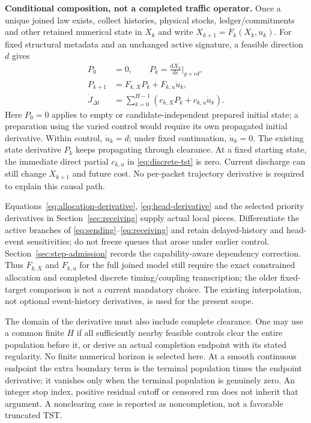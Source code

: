 \documentclass[11pt]{article}
\newcommand{\dd}{\mathrm d}
\begin{document}
\textbf{Conditional composition, not a completed traffic operator.} Once a unique joined law exists, collect histories, physical stocks, ledger/commitments and other retained numerical state in $X_k$ and write $X_{k+1}=F_k(X_k,u_k)$. For fixed structural metadata and an unchanged active signature, a feasible direction $d$ gives
\begin{align}
 P_0&=0,\qquad P_k=\frac{\dd X_k}{\dd\epsilon}\bigg|_{g+\epsilon d},\\
 P_{k+1}&=F_{k,X}P_k+F_{k,u}\dot u_k,
 \label{eq:state-sensitivity}\\
 \dot J_{\Delta t}&=\sum_{k=0}^{H-1}
 \left(c_{k,X}P_k+c_{k,u}\dot u_k\right).
 \label{eq:objective-sensitivity}
\end{align}
Here $P_0=0$ applies to empty or candidate-independent prepared initial state; a preparation using the varied control would require its own propagated initial derivative. Within control, $\dot u_k=d$; under fixed continuation, $\dot u_k=0$. The existing state derivative $P_k$ keeps propagating through clearance. At a fixed starting state, the immediate direct partial $c_{k,u}$ in \eqref{eq:discrete-tst} is zero. Current discharge can still change $X_{k+1}$ and future cost. No per-packet trajectory derivative is required to explain this causal path.

Equations~\eqref{eq:allocation-derivative}, \eqref{eq:head-derivative} and the selected priority derivatives in Section~\ref{sec:receiving} supply actual local pieces. Differentiate the active branches of \eqref{eq:sending}--\eqref{eq:receiving} and retain delayed-history and head-event sensitivities; do not freeze queues that arose under earlier control. Section~\ref{sec:step-admission} records the capability-aware dependency correction. Thus $F_{k,X}$ and $F_{k,u}$ for the full joined model still require the exact constrained allocation and completed discrete timing/coupling transcription; the older fixed-target comparison is not a current mandatory choice. The existing interpolation, not optional event-history derivatives, is used for the present scope.

The domain of the derivative must also include complete clearance. One may use a common finite $H$ if all sufficiently nearby feasible controls clear the entire population before it, or derive an actual completion endpoint with its stated regularity. No finite numerical horizon is selected here. At a smooth continuous endpoint the extra boundary term is the terminal population times the endpoint derivative; it vanishes only when the terminal population is genuinely zero. An integer stop index, positive residual cutoff or censored run does not inherit that argument. A nonclearing case is reported as noncompletion, not a favorable truncated TST.
\end{document}

